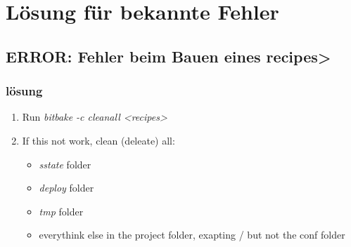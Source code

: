 \chapter{Lösung für bekannte Fehler}%
\label{cha:losung_fur_bekannte_fehler}


\section{\textbf{ERROR:} Fehler beim Bauen eines recipes>}
\label{sec:fehler_beim_bauen_eines_images}


\subsection{lösung}%
\label{sub:losung_fehler_beim_bauen_eines_images}


\begin{enumerate}
    \item Run \textit{bitbake -c cleanall <recipes>}
    \item If this not work, clean (deleate) all:
    \begin{itemize}
        \item \textit{sstate} folder
        \item \textit{deploy} folder
        \item \textit{tmp} folder
        \item everythink else in the project folder, exapting / but not the conf
            folder
    \end{itemize}
\end{enumerate}
